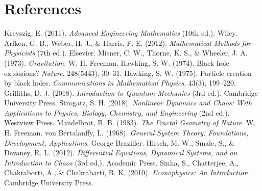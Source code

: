 \documentclass{article}
\begin{document}
\section*{References}
\begin{thebibliography}{99}
 Kreyszig, E. (2011). \textit{Advanced Engineering Mathematics} (10th ed.). Wiley.
 Arfken, G. B., Weber, H. J., \& Harris, F. E. (2012). \textit{Mathematical Methods for Physicists} (7th ed.). Elsevier.
 Misner, C. W., Thorne, K. S., \& Wheeler, J. A. (1973). \textit{Gravitation}. W. H. Freeman.
 Hawking, S. W. (1974). Black hole explosions? \textit{Nature}, 248(5443), 30--31.
 Hawking, S. W. (1975). Particle creation by black holes. \textit{Communications in Mathematical Physics}, 43(3), 199--220.
 Griffiths, D. J. (2018). \textit{Introduction to Quantum Mechanics} (3rd ed.). Cambridge University Press.
 Strogatz, S. H. (2018). \textit{Nonlinear Dynamics and Chaos: With Applications to Physics, Biology, Chemistry, and Engineering} (2nd ed.). Westview Press.
 Mandelbrot, B. B. (1983). \textit{The Fractal Geometry of Nature}. W. H. Freeman.
 von Bertalanffy, L. (1968). \textit{General System Theory: Foundations, Development, Applications}. George Braziller.
 Hirsch, M. W., Smale, S., \& Devaney, R. L. (2012). \textit{Differential Equations, Dynamical Systems, and an Introduction to Chaos} (3rd ed.). Academic Press.
 Sinha, S., Chatterjee, A., Chakraborti, A., \& Chakrabarti, B. K. (2010). \textit{Econophysics: An Introduction}. Cambridge University Press.
\end{thebibliography}
\end{document}

